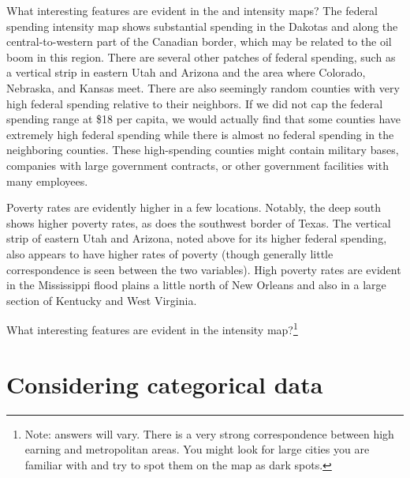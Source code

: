 \begin{example}{What interesting features are evident in the  and  intensity maps?}
The federal spending intensity map shows substantial spending in the Dakotas and along the central-to-western part of the Canadian border, which may be related to the oil boom in this region. There are several other patches of federal spending, such as a vertical strip in eastern Utah and Arizona and the area where Colorado, Nebraska, and Kansas meet. There are also seemingly random counties with very high federal spending relative to their neighbors. If we did not cap the federal spending range at \$18 per capita, we would actually find that some counties have extremely high federal spending while there is almost no federal spending in the neighboring counties. These high-spending counties might contain military bases, companies with large government contracts, or other government facilities with many employees.

Poverty rates are evidently higher in a few locations. Notably, the deep south shows higher poverty rates, as does the southwest border of Texas. The vertical strip of eastern Utah and Arizona, noted above for its higher federal spending, also appears to have higher rates of poverty (though generally little correspondence is seen between the two variables). High poverty rates are evident in the Mississippi flood plains a little north of New Orleans and also in a large section of Kentucky and West Virginia.
\end{example}

\begin{exercise}
What interesting features are evident in the  intensity map?\footnote{Note: answers will vary. There is a very strong correspondence between high earning and metropolitan areas. You might look for large cities you are familiar with and try to spot them on the map as dark spots.}
\end{exercise}



\section[Considering categorical data]{Considering categorical data }
\label{categoricalData}

